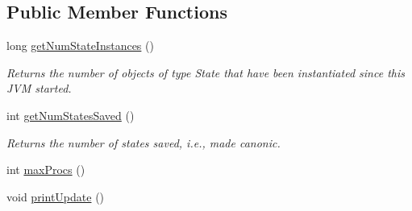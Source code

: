 \subsection*{Public Member Functions}
\begin{DoxyCompactItemize}
\item 
long \hyperlink{interfaceedu_1_1udel_1_1cis_1_1vsl_1_1civl_1_1kripke_1_1IF_1_1StateManager_aa8f03501c557006fbfc83e78e4b77a84}{get\+Num\+State\+Instances} ()
\begin{DoxyCompactList}\small\item\em Returns the number of objects of type State that have been instantiated since this J\+V\+M started. \end{DoxyCompactList}\item 
int \hyperlink{interfaceedu_1_1udel_1_1cis_1_1vsl_1_1civl_1_1kripke_1_1IF_1_1StateManager_a0414d1dd8a77764a281bbd8a9c846bbb}{get\+Num\+States\+Saved} ()
\begin{DoxyCompactList}\small\item\em Returns the number of states saved, i.\+e., made canonic. \end{DoxyCompactList}\item 
int \hyperlink{interfaceedu_1_1udel_1_1cis_1_1vsl_1_1civl_1_1kripke_1_1IF_1_1StateManager_acbbeefaaff0081bc6756d21b2abd20e7}{max\+Procs} ()
\item 
\hypertarget{interfaceedu_1_1udel_1_1cis_1_1vsl_1_1civl_1_1kripke_1_1IF_1_1StateManager_a54df170b978600e9d78332b5c5a32d25}{}void \hyperlink{interfaceedu_1_1udel_1_1cis_1_1vsl_1_1civl_1_1kripke_1_1IF_1_1StateManager_a54df170b978600e9d78332b5c5a32d25}{print\+Update} ()\label{interfaceedu_1_1udel_1_1cis_1_1vsl_1_1civl_1_1kripke_1_1IF_1_1StateManager_a54df170b978600e9d78332b5c5a32d25}


\end{DoxyCompactItemize}
